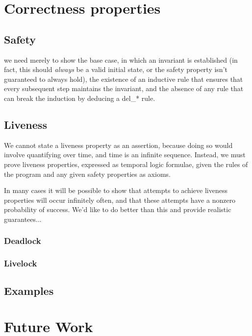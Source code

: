 \documentclass{acm_proc_article-sp-sigmod09}
\begin{document}
\section{Correctness properties}

\subsection{Safety}

we need merely to show the base case, in which an invariant is established (in fact, this should \emph{always} be a valid 
initial state, or the safety property isn't guaranteed to always hold), the existence of an inductive rule that ensures that every 
subsequent step maintains the invariant, and the absence of any rule that can break the induction by deducing a del\_* rule.

\subsection{Liveness}

We cannot state a liveness property as an assertion, because doing so would involve quantifying over time,
and time is an infinite sequence.  Instead, we must prove liveness properties, expressed as temporal logic
formulae, given the rules of the program and any given safety properties as axioms.

In many cases it will be possible to show that attempts to achieve liveness properties will occur infinitely often, and that
these attempts have a nonzero probability of success.  We'd like to do better than this and provide realistic guarantees...

\subsubsection{Deadlock}



\subsubsection{Livelock}

\subsection{Examples}

\section{Future Work}




\end{document}
